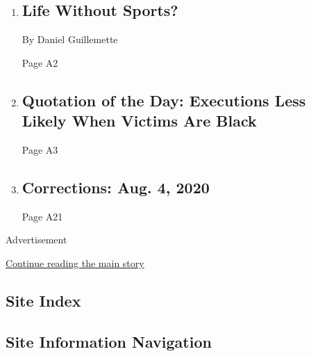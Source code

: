 \begin{enumerate}
\def\labelenumi{\arabic{enumi}.}
\item
  \href{/2020/07/31/podcasts/daily-newsletter-baseball-season-serial.html}{}

  \hypertarget{life-without-sports}{%
  \subsection{Life Without Sports?}\label{life-without-sports}}

  By Daniel Guillemette

  Page A2
\item
  \href{/2020/08/03/todayspaper/quotation-of-the-day-executions-less-likely-when-victims-are-black.html}{}

  \hypertarget{quotation-of-the-day-executions-less-likely-when-victims-are-black}{%
  \subsection{Quotation of the Day: Executions Less Likely When Victims
  Are
  Black}\label{quotation-of-the-day-executions-less-likely-when-victims-are-black}}

  Page A3
\item
  \href{/2020/08/03/pageoneplus/corrections-aug-4-2020.html}{}

  \hypertarget{corrections-aug-4-2020}{%
  \subsection{Corrections: Aug. 4, 2020}\label{corrections-aug-4-2020}}

  Page A21
\end{enumerate}

Advertisement

\protect\hyperlink{after-mid6}{Continue reading the main story}

\hypertarget{site-index}{%
\subsection{Site Index}\label{site-index}}

\hypertarget{site-information-navigation}{%
\subsection{Site Information
Navigation}\label{site-information-navigation}}

